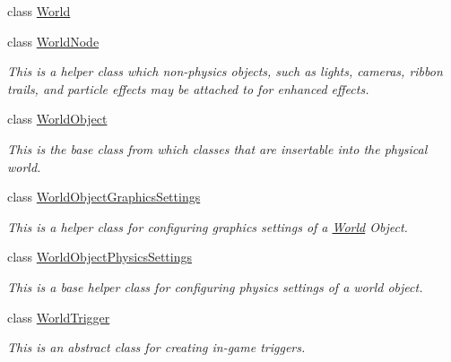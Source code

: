 \begin{DoxyCompactItemize}
class \hyperlink{classMezzanine_1_1World}{World}
\item 
class \hyperlink{classMezzanine_1_1WorldNode}{World\-Node}
\begin{DoxyCompactList}\small\item\em This is a helper class which non-\/physics objects, such as lights, cameras, ribbon trails, and particle effects may be attached to for enhanced effects. \end{DoxyCompactList}\item 
class \hyperlink{classMezzanine_1_1WorldObject}{World\-Object}
\begin{DoxyCompactList}\small\item\em This is the base class from which classes that are insertable into the physical world. \end{DoxyCompactList}\item 
class \hyperlink{classMezzanine_1_1WorldObjectGraphicsSettings}{World\-Object\-Graphics\-Settings}
\begin{DoxyCompactList}\small\item\em This is a helper class for configuring graphics settings of a \hyperlink{classMezzanine_1_1World}{World} Object. \end{DoxyCompactList}\item 
class \hyperlink{classMezzanine_1_1WorldObjectPhysicsSettings}{World\-Object\-Physics\-Settings}
\begin{DoxyCompactList}\small\item\em This is a base helper class for configuring physics settings of a world object. \end{DoxyCompactList}\item 
class \hyperlink{classMezzanine_1_1WorldTrigger}{World\-Trigger}
\begin{DoxyCompactList}\small\item\em This is an abstract class for creating in-\/game triggers. \end{DoxyCompactList}\end{DoxyCompactItemize}
